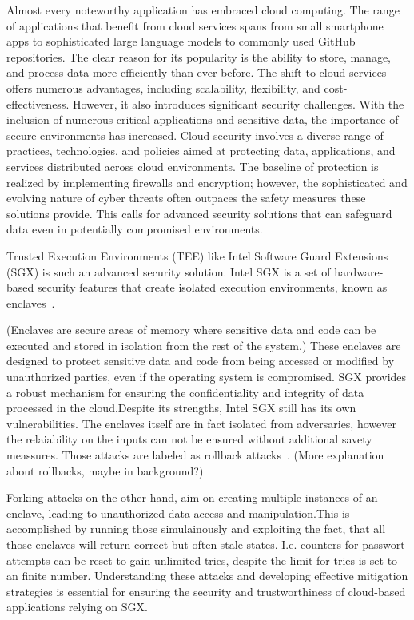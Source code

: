 
Almost every noteworthy application has embraced cloud computing. The range of applications that benefit from cloud services spans from small smartphone apps to sophisticated large language models to commonly used GitHub repositories. The clear reason for its popularity is the ability to store, manage, and process data more efficiently than ever before. The shift to cloud services offers numerous advantages, including scalability, flexibility, and cost-effectiveness. However, it also introduces significant security challenges. With the inclusion of numerous critical applications and sensitive data, the importance of secure environments has increased. Cloud security involves a diverse range of practices, technologies, and policies aimed at protecting data, applications, and services distributed across cloud environments. The baseline of protection is realized by implementing firewalls and encryption; however, the sophisticated and evolving nature of cyber threats often outpaces the safety measures these solutions provide. This calls for advanced security solutions that can safeguard data even in potentially compromised environments.


Trusted Execution Environments (TEE) like Intel Software Guard Extensions (SGX) is such an advanced security solution. Intel SGX is a set of hardware-based security features that create isolated execution environments, known as enclaves~\cite{nfw}. 

(Enclaves are secure areas of memory where sensitive data and code can be executed and stored in isolation from the rest of the system.) These enclaves are designed to protect sensitive data and code from being accessed or modified by unauthorized parties, even if the operating system is compromised. SGX provides a robust mechanism for ensuring the confidentiality and integrity of data processed in the cloud.Despite its strengths, Intel SGX still has its own vulnerabilities. The enclaves itself are in fact isolated from adversaries, however the relaiability on the inputs can not be ensured without additional savety meassures. Those attacks are labeled as rollback attacks~\cite{esccc}. (More explanation about rollbacks, maybe in background?)

Forking attacks on the other hand, aim on creating multiple instances of an enclave, leading to unauthorized data access and manipulation.This is accomplished by running those simulainously and exploiting the fact, that all those enclaves will return correct but often stale states. I.e. counters for passwort attempts can be reset to gain unlimited tries, despite the limit for tries is set to an finite number. Understanding these attacks and developing effective mitigation strategies is essential for ensuring the security and trustworthiness of cloud-based applications relying on SGX.



